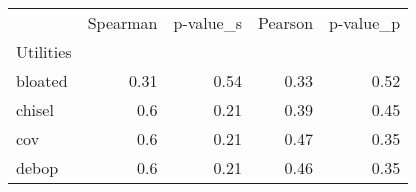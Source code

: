 \begin{tabular}{lrrrr}
\toprule
 & Spearman & p-value_s & Pearson & p-value_p \\
Utilities &  &  &  &  \\
\midrule
bloated & 0.31 & 0.54 & 0.33 & 0.52 \\
chisel & 0.6 & 0.21 & 0.39 & 0.45 \\
cov & 0.6 & 0.21 & 0.47 & 0.35 \\
debop & 0.6 & 0.21 & 0.46 & 0.35 \\
\bottomrule
\end{tabular}
